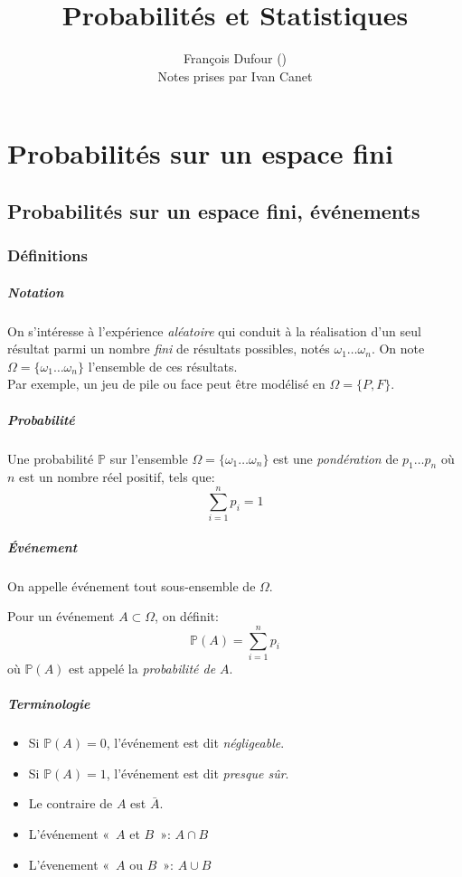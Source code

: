 \documentclass[a4paper,10pt,french]{memoir}
\title{Probabilités et Statistiques}
\author{François Dufour (\hrefu{mailto://francois.dufour@math.u-bordeaux.fr}{francois.dufour@math.u-bordeaux.fr})\\Notes prises par Ivan Canet}
\newcommand{\Proba}{\mathbb{P}}
\newcommand{\inter}{\cap}
\newcommand{\union}{\cup}
\begin{document}
\maketitle
\tableofcontents

\chapter{Probabilités sur un espace fini}
\section{Probabilités sur un espace fini, événements}
\subsection{Définitions}

\paragraph{Notation}
On s'intéresse à l'expérience \emph{aléatoire} qui conduit à la réalisation d'un seul résultat parmi un nombre \emph{fini} de résultats possibles, notés $\omega_1\dots \omega_n$. On note $\Omega = \lbrace \omega_1\dots\omega_n \rbrace$ l'ensemble de ces résultats.\\
Par exemple, un jeu de pile ou face peut être modélisé en $\Omega = \lbrace P, F \rbrace$.

\paragraph{Probabilité}
Une probabilité $\Proba$ sur l'ensemble $\Omega = \lbrace \omega_1\dots\omega_n \rbrace$ est une \emph{pondération} de $p_1\dots p_n$ où $n$ est un nombre réel positif, tels que:
\[\sum_{i=1}^n p_i = 1\]

\paragraph{Événement}
On appelle événement tout sous-ensemble de $\Omega$.

Pour un événement $A \subset \Omega$, on définit:
\[\Proba(A) = \sum_{i=1}^n p_i\]
où $\Proba(A)$ est appelé la \emph{probabilité de $A$}.

\paragraph{Terminologie}
\begin{itemize}
 \item Si $\Proba(A)=0$, l'événement est dit \emph{négligeable}.
 \item Si $\Proba(A)=1$, l'événement est dit \emph{presque sûr}.
 \item Le contraire de $A$ est $\bar{A}$.
 \item L'événement «~$A$ et $B$~»: $A \inter B$
 \item L'évenement «~$A$ ou $B$~»: $A \union B$
\end{itemize}
\end{document}
